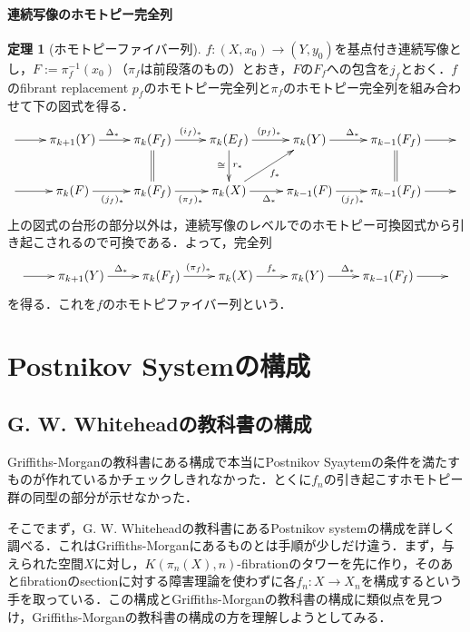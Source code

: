 \documentclass[a4paper,11pt]{jsarticle}
\theoremstyle{definition}
\newtheorem{thm}{定理}[section]
\begin{document}
\paragraph{連続写像のホモトピー完全列}
\begin{thm}[ホモトピーファイバー列]
  $f\colon (X,x_0)\to (Y,y_0)$を基点付き連続写像とし，$F:=\pi_f^{-1}(x_0)$（$\pi_f$は前段落のもの）とおき，$F$の$F_f$への包含を$j_f$とおく．$f$のfibrant replacement $p_f$のホモトピー完全列と$\pi_f$のホモトピー完全列を組み合わせて下の図式を得る．
\[\xymatrix{
  \ar[r]&
  \pi_{k+1}(Y)\ar[r]^{\Delta_*}&
  \pi_{k}(F_f)\ar[r]^{(i_f)_*}\ar@{=}[d]&
  \pi_k(E_f)\ar[r]^{(p_f)_*}\ar[d]^{r_*}_{\cong}&
  \pi_{k}(Y)\ar[r]^{\Delta_*}&
  \pi_{k-1}(F_f)\ar[r]\ar@{=}[d]&
  \\
  \ar[r]&
  \pi_k(F)\ar[r]_{(j_{f})_*}&
  \pi_k(F_f)\ar[r]_{(\pi_f)_*}&
  \pi_k(X)\ar[r]_{\Delta_*}\ar[ru]_{f_*}&
  \pi_{k-1}(F)\ar[r]_{(j_{f})_*}&
  \pi_{k-1}(F_f)\ar[r]&
}\]
上の図式の台形の部分以外は，連続写像のレベルでのホモトピー可換図式から引き起こされるので可換である．よって，完全列
\[\xymatrix{
  \ar[r]&
  \pi_{k+1}(Y)\ar[r]^{\Delta_*}&
  \pi_k(F_f)\ar[r]^{(\pi_f)_*}&
  \pi_k(X)\ar[r]^{f_*}&
  \pi_k(Y)\ar[r]^{\Delta_*}&
  \pi_{k-1}(F_f)\ar[r]&
}\]
を得る．これを$f$のホモトピファイバー列という．
\end{thm}


\section{Postnikov Systemの構成}

\subsection{G. W. Whiteheadの教科書の構成}
Griffiths-Morganの教科書にある構成で本当にPostnikov Syaytemの条件を満たすものが作れているかチェックしきれなかった．とくに$f_n$の引き起こすホモトピー群の同型の部分が示せなかった．

そこでまず，G. W. Whiteheadの教科書にあるPostnikov systemの構成を詳しく調べる．これはGriffiths-Morganにあるものとは手順が少しだけ違う．まず，与えられた空間$X$に対し，$K(\pi_n(X),n)$-fibrationのタワーを先に作り，そのあとfibrationのsectionに対する障害理論を使わずに各$f_n\colon X\to X_n$を構成するという手を取っている．この構成とGriffiths-Morganの教科書の構成に類似点を見つけ，Griffiths-Morganの教科書の構成の方を理解しようとしてみる．
\end{document}
